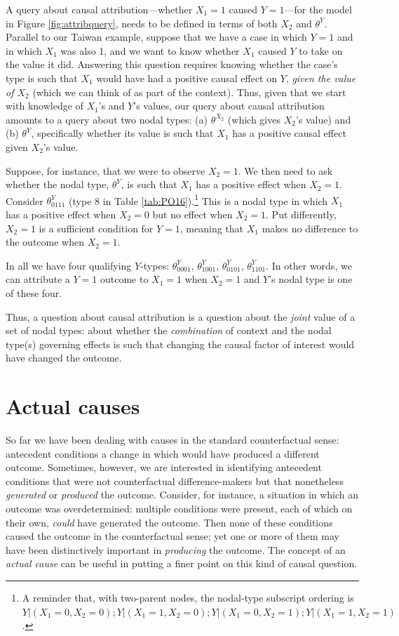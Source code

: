 \documentclass[
  12pt,
]{book}
\begin{document}
A query about causal attribution---whether \(X_1 = 1\) caused \(Y=1\)---for the model in Figure \ref{fig:attribquery}, needs to be defined in terms of both \(X_2\) and \(\theta^Y\). Parallel to our Taiwan example, suppose that we have a case in which \(Y=1\) and in which \(X_1\) was also 1, and we want to know whether \(X_1\) caused \(Y\) to take on the value it did. Answering this question requires knowing whether the case's type is such that \(X_1\) would have had a positive causal effect on \(Y\), \emph{given the value of \(X_2\)} (which we can think of as part of the context). Thus, given that we start with knowledge of \(X_1\)'s and \(Y\)'s values, our query about causal attribution amounts to a query about two nodal types: (a) \(\theta^{X_2}\) (which gives \(X_2\)'s value) and (b) \(\theta^Y\), specifically whether its value is such that \(X_1\) has a positive causal effect given \(X_2\)'s value.

Suppose, for instance, that we were to observe \(X_2=1\). We then need to ask whether the nodal type, \(\theta^Y\), is such that \(X_1\) has a positive effect when \(X_2=1\). Consider \(\theta^Y_{0111}\) (type 8 in Table \ref{tab:PO16}).\footnote{A reminder that, with two-parent nodes, the nodal-type subscript ordering is \(Y|(X_1=0, X_2=0); Y|(X_1=1, X_2=0); Y|(X_1=0, X_2=1); Y|(X_1=1, X_2=1)\).} This is a nodal type in which \(X_1\) has a positive effect when \(X_2=0\) but no effect when \(X_2=1\). Put differently, \(X_2=1\) is a sufficient condition for \(Y=1\), meaning that \(X_1\) makes no difference to the outcome when \(X_2=1\).

In all we have four qualifying \(Y\)-types: \(\theta^Y_{0001}\), \(\theta^Y_{1001}\), \(\theta^Y_{0101}\), \(\theta^Y_{1101}\). In other words, we can attribute a \(Y=1\) outcome to \(X_1=1\) when \(X_2=1\) and \(Y\)'s nodal type is one of these four.

Thus, a question about causal attribution is a question about the \emph{joint} value of a set of nodal types: about whether the \emph{combination} of context and the nodal type(s) governing effects is such that changing the causal factor of interest would have changed the outcome.

\hypertarget{actual-causes}{%
\section{Actual causes}\label{actual-causes}}

So far we have been dealing with causes in the standard counterfactual sense: antecedent conditions a change in which would have produced a different outcome. Sometimes, however, we are interested in identifying antecedent conditions that were not counterfactual difference-makers but that nonetheless \emph{generated} or \emph{produced} the outcome. Consider, for instance, a situation in which an outcome was overdetermined: multiple conditions were present, each of which on their own, \emph{could} have generated the outcome. Then none of these conditions caused the outcome in the counterfactual sense; yet one or more of them may have been distinctively important in \emph{producing} the outcome. The concept of an \emph{actual cause} can be useful in putting a finer point on this kind of causal question.
\end{document}
